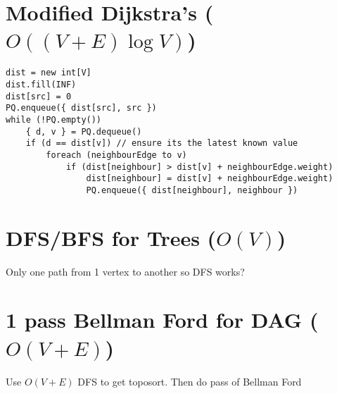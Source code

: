\documentclass[12pt]{article}
\begin{document}
\begin{spacing}{1.5}
\section{Modified Dijkstra's ($O((V+E) \log{V})$)}

\begin{verbatim}
dist = new int[V]
dist.fill(INF)
dist[src] = 0
PQ.enqueue({ dist[src], src }) 
while (!PQ.empty())
	{ d, v } = PQ.dequeue()
	if (d == dist[v]) // ensure its the latest known value
	    foreach (neighbourEdge to v)
	        if (dist[neighbour] > dist[v] + neighbourEdge.weight)
	            dist[neighbour] = dist[v] + neighbourEdge.weight)
	            PQ.enqueue({ dist[neighbour], neighbour })
\end{verbatim}


\section{DFS/BFS for Trees ($O(V)$)}

Only one path from 1 vertex to another so DFS works?

\section{1 pass Bellman Ford for DAG ($O(V+E)$)}

Use $O(V+E)$ DFS to get toposort. Then do pass of Bellman Ford

\end{spacing}
\end{document}
